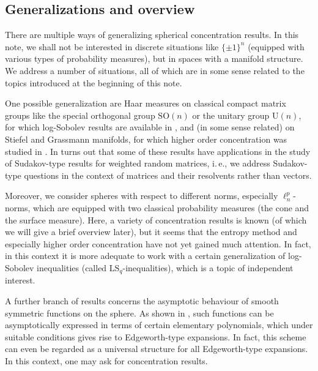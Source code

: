 \documentclass[a4paper,12pt]{amsart}
\numberwithin{equation}{section}
\theoremstyle{remark}
\begin{document}
\subsection{Generalizations and overview}
There are multiple ways of generalizing spherical concentration results. In this note, we shall not be interested in discrete situations like $\{\pm1\}^n$ (equipped with various types of probability measures), but in spaces with a manifold structure. We address a number of situations, all of which are in some sense related to the topics introduced at the beginning of this note.

One possible generalization are Haar measures on classical compact matrix groups like the special orthogonal group $\mathrm{SO}(n)$ or the unitary group $\mathrm{U}(n)$, for which log-Sobolev results are available in \cite{Mec19}, and (in some sense related) on Stiefel and Grassmann manifolds, for which higher order concentration was studied in \cite{GS23}. In turns out that some of these results have applications in the study of Sudakov-type results for weighted random matrices, i.\,e., we address Sudakov-type questions in the context of matrices and their resolvents rather than vectors.

Moreover, we consider spheres with respect to different norms, especially $\ell_n^p$-norms, which are equipped with two classical probability measures (the cone and the surface measure). Here, a variety of concentration results is known (of which we will give a brief overview later), but it seems that the entropy method and especially higher order concentration have not yet gained much attention. In fact, in this context it is more adequate to work with a certain generalization of log-Sobolev inequalities (called $\mathrm{LS}_q$-inequalities), which is a topic of independent interest.

A further branch of results concerns the asymptotic behaviour of smooth symmetric functions on the sphere. As shown in \cite{GNU17}, such functions can be asymptotically expressed in terms of certain elementary polynomials, which under suitable conditions gives rise to Edgeworth-type expansions. In fact, this scheme can even be regarded as a universal structure for all Edgeworth-type expansions. In this context, one may ask for concentration results.
\end{document}
